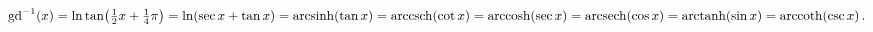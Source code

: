\[\mathop{{\mathrm{gd}^{-1}}\/}\nolimits\!\left(x\right)=\mathop{\ln\/}\nolimits%
\mathop{\tan\/}\nolimits\!\left(\tfrac{1}{2}x+\tfrac{1}{4}\pi\right)=\mathop{%
\ln\/}\nolimits\!\left(\mathop{\sec\/}\nolimits x+\mathop{\tan\/}\nolimits x%
\right)=\mathop{\mathrm{arcsinh}\/}\nolimits\!\left(\mathop{\tan\/}\nolimits x%
\right)=\mathop{\mathrm{arccsch}\/}\nolimits\!\left(\mathop{\cot\/}\nolimits x%
\right)=\mathop{\mathrm{arccosh}\/}\nolimits\!\left(\mathop{\sec\/}\nolimits x%
\right)=\mathop{\mathrm{arcsech}\/}\nolimits\!\left(\mathop{\cos\/}\nolimits x%
\right)=\mathop{\mathrm{arctanh}\/}\nolimits\!\left(\mathop{\sin\/}\nolimits x%
\right)=\mathop{\mathrm{arccoth}\/}\nolimits\!\left(\mathop{\csc\/}\nolimits x%
\right).\]